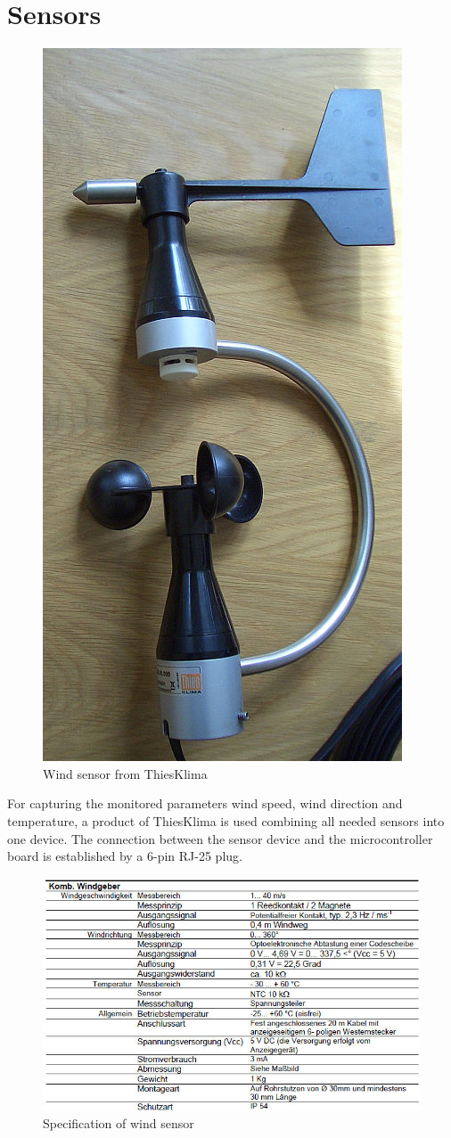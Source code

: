 
\chapter{Sensors}

\begin{figure}[ht]
    \centering
    \includegraphics[width=0.6\linewidth]{graphics/windsensor.jpg}
    \caption{Wind sensor from ThiesKlima}
    \label{fig:windsensor}
\end{figure}

For capturing the monitored parameters wind speed, wind direction and temperature, a product of ThiesKlima is used combining all needed sensors into one device. The connection between the sensor device and the microcontroller board is established by a 6-pin RJ-25 plug.

\begin{figure}[ht]
    \centering
    \includegraphics[width=0.8\linewidth]{graphics/windsensor_specs.jpg}
    \caption{Specification of wind sensor}
    \label{fig:windsensor_spec}
\end{figure}

